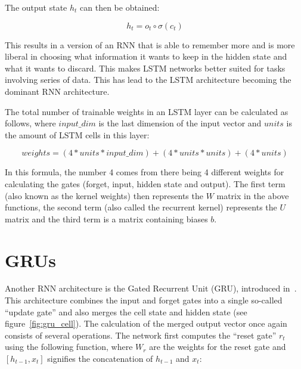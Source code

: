 The output state \(h_t\) can then be obtained:

\begin{equation} \label{eq:hidden_output_gate_lstm}
h_t = o_t \circ \sigma(c_t)
\end{equation}

This results in a version of an RNN that is able to remember more and is more liberal in choosing what information it wants to keep in the hidden state and what it wants to discard. This makes LSTM networks better suited for tasks involving series of data. This has lead to the LSTM architecture becoming the dominant RNN architecture. 

The total number of trainable weights in an LSTM layer can be calculated as follows, where \(input\_dim \) is the last dimension of the input vector and \(units\) is the amount of LSTM cells in this layer:

\begin{equation} \label{eq:lstm_weights}
weights = (4 * units * input\_dim ) + (4 * units * units) + (4 * units)
\end{equation}

In this formula, the number 4 comes from there being 4 different weights for calculating the gates (forget, input, hidden state and output). The first term (also known as the kernel weights) then represents the \(W\) matrix in the above functions, the second term (also called the recurrent kernel) represents the \(U\) matrix and the third term is a matrix containing biases \(b\).

\section{GRUs}
Another RNN architecture is the Gated Recurrent Unit (GRU), introduced in~\cite{cho2014learning}. This architecture combines the input and forget gates into a single so-called \enquote{update gate} and also merges the cell state and hidden state (see figure~\ref{fig:gru_cell}). The calculation of the merged output vector once again consists of several operations. The network first computes the \enquote{reset gate} \(r_t\) using the following function, where \(W_r\) are the weights for the reset gate and \([h_{t-1}, x_t]\) signifies the concatenation of \(h_{t-1}\) and \(x_t\):

